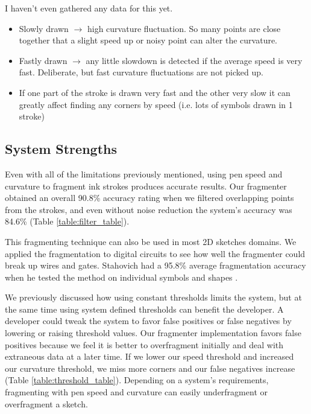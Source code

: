 \documentclass[10pt]{acmsiggraph}          %
\begin{document}
I haven't even gathered any data for this yet.

\begin{itemize}
  \item Slowly drawn $\rightarrow$ high curvature fluctuation. So many points are close together that a slight speed up or noisy point can alter the curvature.
  \item Fastly drawn $\rightarrow$ any little slowdown is detected if the average speed is very fast. Deliberate, but fast curvature fluctuations are not picked up.
  \item If one part of the stroke is drawn very fast and the other very slow it can greatly affect finding any corners by speed (i.e. lots of symbols drawn in 1 stroke)
\end{itemize}





\subsection{System Strengths}

Even with all of the limitations previously mentioned, using pen speed and curvature to fragment ink strokes produces accurate results. Our fragmenter
obtained an overall 90.8\% accuracy rating when we filtered overlapping points from the strokes, and even without noise reduction the system's accuracy was 84.6\% (Table \ref{table:filter_table}).

This fragmenting technique can also be used in most 2D sketches domains. We applied the fragmentation to digital circuits to see how well the fragmenter could break up
wires and gates. Stahovich had a 95.8\% average fragmentation accuracy when he tested the method on individual symbols and shapes . 

We previously discussed how using constant thresholds limits the system, but at the same time using system defined thresholds can benefit the developer. A developer could tweak the system to favor false positives or false negatives by lowering or raising threshold values. Our fragmenter implementation favors false positives because we feel it is better to overfragment initially and deal with extraneous data at a later time. If we lower our speed threshold and increased our curvature threshold, we miss more corners and our false negatives increase (Table \ref{table:threshold_table}). Depending on a system's requirements, fragmenting with pen speed and curvature can easily underfragment or overfragment a sketch.
\end{document}
